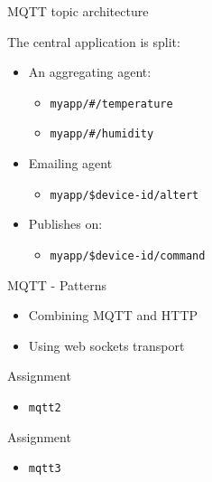 \begin{frame}[fragile]{MQTT topic architecture}
\protect\hypertarget{mqtt-topic-architecture}{}

The central application is split:

\begin{itemize}
\tightlist
\item
  An aggregating agent:

  \begin{itemize}
  \tightlist
  \item
    \texttt{myapp/\#/temperature}
  \item
    \texttt{myapp/\#/humidity}
  \end{itemize}
\item
  Emailing agent

  \begin{itemize}
  \tightlist
  \item
    \texttt{myapp/\$device-id/altert}
  \end{itemize}
\item
  Publishes on:

  \begin{itemize}
  \tightlist
  \item
    \texttt{myapp/\$device-id/command}
  \end{itemize}
\end{itemize}

\note{}

\end{frame}

\begin{frame}{MQTT - Patterns}
\protect\hypertarget{mqtt---patterns}{}

\begin{itemize}
\tightlist
\item
  Combining MQTT and HTTP
\item
  Using web sockets transport
\end{itemize}

\end{frame}

\begin{frame}[fragile]{Assignment}
\protect\hypertarget{assignment-1}{}

\begin{itemize}
\tightlist
\item
  \texttt{mqtt2}
\end{itemize}

\end{frame}

\begin{frame}[fragile]{Assignment}
\protect\hypertarget{assignment-2}{}

\begin{itemize}
\tightlist
\item
  \texttt{mqtt3}
\end{itemize}


\end{frame}
